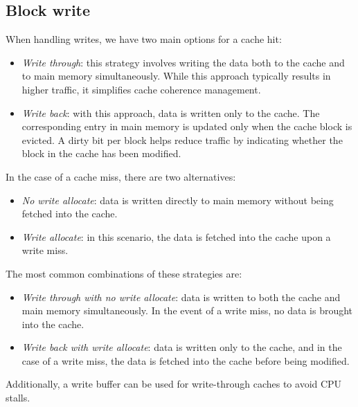 \subsection{Block write}
When handling writes, we have two main options for a cache hit:
\begin{itemize}
    \item \textit{Write through}: this strategy involves writing the data both to the cache and to main memory simultaneously. 
        While this approach typically results in higher traffic, it simplifies cache coherence management.
    \item \textit{Write back}: with this approach, data is written only to the cache. 
        The corresponding entry in main memory is updated only when the cache block is evicted. 
        A dirty bit per block helps reduce traffic by indicating whether the block in the cache has been modified.
\end{itemize}
In the case of a cache miss, there are two alternatives:
\begin{itemize}
    \item \textit{No write allocate}: data is written directly to main memory without being fetched into the cache.
    \item \textit{Write allocate}: in this scenario, the data is fetched into the cache upon a write miss.
\end{itemize}
The most common combinations of these strategies are:
\begin{itemize}
    \item \textit{Write through with no write allocate}: data is written to both the cache and main memory simultaneously. In the event of a write miss, no data is brought into the cache.
    \item \textit{Write back with write allocate}: data is written only to the cache, and in the case of a write miss, the data is fetched into the cache before being modified.
\end{itemize}
Additionally, a write buffer can be used for write-through caches to avoid CPU stalls.